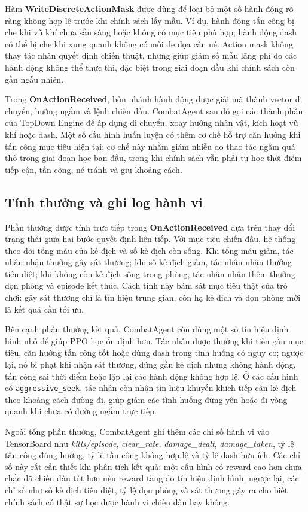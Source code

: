 Hàm \textbf{WriteDiscreteActionMask} được dùng để loại bỏ một số hành động rõ ràng không hợp lệ trước khi chính sách lấy mẫu. Ví dụ, hành động tấn công bị che khi vũ khí chưa sẵn sàng hoặc không có mục tiêu phù hợp; hành động dash có thể bị che khi xung quanh không có mối đe dọa cần né. Action mask không thay tác nhân quyết định chiến thuật, nhưng giúp giảm số mẫu lãng phí do các hành động không thể thực thi, đặc biệt trong giai đoạn đầu khi chính sách còn gần ngẫu nhiên.

Trong \textbf{OnActionReceived}, bốn nhánh hành động được giải mã thành vector di chuyển, hướng ngắm và lệnh chiến đấu. CombatAgent sau đó gọi các thành phần của TopDown Engine để áp dụng di chuyển, xoay hướng nhân vật, kích hoạt vũ khí hoặc dash. Một số cấu hình huấn luyện có thêm cơ chế hỗ trợ căn hướng khi tấn công mục tiêu hiện tại; cơ chế này nhằm giảm nhiễu do thao tác ngắm quá thô trong giai đoạn học ban đầu, trong khi chính sách vẫn phải tự học thời điểm tiếp cận, tấn công, né tránh và giữ khoảng cách.

\subsection{Tính thưởng và ghi log hành vi}

Phần thưởng được tính trực tiếp trong \textbf{OnActionReceived} dựa trên thay đổi trạng thái giữa hai bước quyết định liên tiếp. Với mục tiêu chiến đấu, hệ thống theo dõi tổng máu của kẻ địch và số kẻ địch còn sống. Khi tổng máu giảm, tác nhân nhận thưởng gây sát thương; khi số kẻ địch giảm, tác nhân nhận thưởng tiêu diệt; khi không còn kẻ địch sống trong phòng, tác nhân nhận thêm thưởng dọn phòng và episode kết thúc. Cách tính này bám sát mục tiêu thật của trò chơi: gây sát thương chỉ là tín hiệu trung gian, còn hạ kẻ địch và dọn phòng mới là kết quả cần tối ưu.

Bên cạnh phần thưởng kết quả, CombatAgent còn dùng một số tín hiệu định hình nhỏ để giúp PPO học ổn định hơn. Tác nhân được thưởng khi tiến gần mục tiêu, căn hướng tấn công tốt hoặc dùng dash trong tình huống có nguy cơ; ngược lại, nó bị phạt khi nhận sát thương, đứng gần kẻ địch nhưng không hành động, tấn công sai thời điểm hoặc lặp lại các hành động không hợp lệ. Ở các cấu hình có \texttt{aggressive\_seek}, tác nhân còn nhận tín hiệu khuyến khích tiếp cận kẻ địch theo khoảng cách đường đi, giúp giảm các tình huống đứng yên hoặc đi vòng quanh khi chưa có đường ngắm trực tiếp.

Ngoài tổng phần thưởng, CombatAgent ghi thêm các chỉ số hành vi vào TensorBoard như \textit{kills/episode}, \textit{clear\_rate}, \textit{damage\_dealt}, \textit{damage\_taken}, tỷ lệ tấn công đúng hướng, tỷ lệ tấn công không hợp lệ và tỷ lệ dash hữu ích. Các chỉ số này rất cần thiết khi phân tích kết quả: một cấu hình có reward cao hơn chưa chắc đã chiến đấu tốt hơn nếu reward tăng do tín hiệu định hình; ngược lại, các chỉ số như số kẻ địch tiêu diệt, tỷ lệ dọn phòng và sát thương gây ra cho biết chính sách có thật sự học được hành vi chiến đấu hay không.

